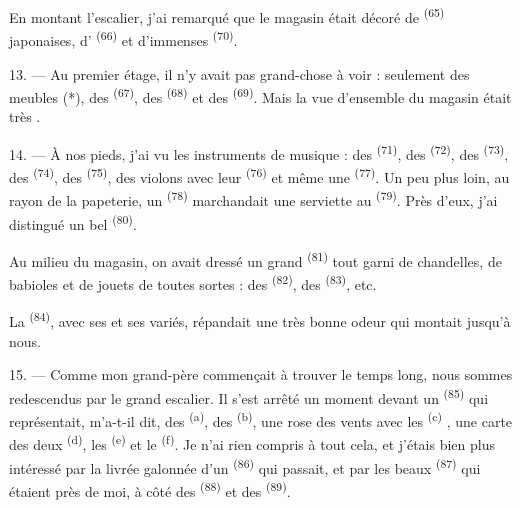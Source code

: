 En montant l'escalier, j'ai remarqué que le magasin était décoré de
 \textsuperscript{(65)} japonaises, d'
\textsuperscript{(66)} et d'immenses  \textsuperscript{(70)}.

13. --- Au premier étage, il n'y avait pas grand-chose à voir : seulement des
meubles (*), des  \textsuperscript{(67)}, des
 \textsuperscript{(68)} et des 
\textsuperscript{(69)}. Mais la vue d'ensemble du magasin était très
.

14. --- À nos pieds, j'ai vu les instruments de musique : des 
\textsuperscript{(71)}, des  \textsuperscript{(72)}, des
 \textsuperscript{(73)}, des 
\textsuperscript{(74)}, des  \textsuperscript{(75)}, des
violons avec leur  \textsuperscript{(76)} et même une
 \textsuperscript{(77)}. Un peu plus loin, au rayon de la
papeterie, un  \textsuperscript{(78)} marchandait une serviette
au  \textsuperscript{(79)}. Près d'eux, j'ai distingué un bel
 \textsuperscript{(80)}.

Au milieu du magasin, on avait dressé un grand 
\textsuperscript{(81)} tout garni de chandelles, de babioles et de jouets de
toutes sortes : des  \textsuperscript{(82)}, des
 \textsuperscript{(83)}, etc.

La  \textsuperscript{(84)}, avec ses  et
ses  variés, répandait une très bonne odeur qui montait
jusqu'à nous.

\VUsaut{3.4mm}
\VUsaut{2.8mm}

15. --- Comme mon grand-père commençait à trouver le temps long, nous sommes
redescendus par le grand escalier. Il s'est arrêté un moment devant un
 \textsuperscript{(85)} qui représentait, m'a-t-il
dit, des  \textsuperscript{(a)}, des  \textsuperscript{(b)}, une rose des vents avec les  \textsuperscript{(c)} , une
carte des deux  \textsuperscript{(d)}, les
 \textsuperscript{(e)} et le 
\textsuperscript{(f)}. Je n'ai rien compris à tout cela, et j'étais bien plus
intéressé par la livrée galonnée d'un 
\textsuperscript{(86)} qui passait, et par les beaux 
\textsuperscript{(87)} qui étaient près de moi, à côté des
 \textsuperscript{(88)} et des 
\textsuperscript{(89)}.

